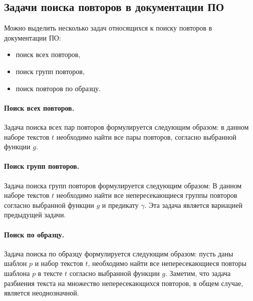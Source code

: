 \subsection{Задачи поиска повторов в документации ПО}

Можно выделить несколько задач относящихся к поиску повторов в документации ПО:
\begin{itemize}
\item поиск всех повторов,
\item поиск групп повторов,
\item поиск повторов по образцу.
\end{itemize}

\paragraph{Поиск всех повторов.}
Задача поиска всех пар повторов формулируется следующим образом: в данном наборе текстов $t$ необходимо найти все пары повторов, согласно выбранной функции $g$.

\paragraph{Поиск групп повторов.}
Задача поиска групп повторов формулируется следующим образом:
В данном наборе текстов $t$ необходимо найти все непересекающиеся группы повторов согласно выбранной функции $g$ и предикату $\gamma$.
Эта задача является вариацией предыдущей задачи.

\paragraph{Поиск по образцу.}
Задача поиска по образцу формулируется следующим образом:
пусть даны шаблон $p$ и набор текстов $t$, необходимо найти все непересекающиеся повторы шаблона $p$ в тексте $t$ согласно выбранной функции  $g$.
Заметим, что задача разбиения текста на множество непересекающихся повторов, в общем случае, является неоднозначной.



